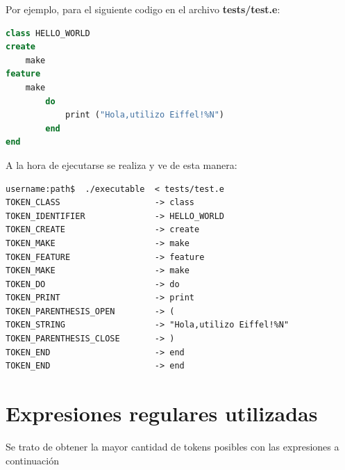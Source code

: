 \documentclass[a4paper,12pt]{article}
\begin{document}
\vspace{4mm}
\noindent
Por ejemplo, para el siguiente codigo en el archivo \textbf{tests/test.e}:

\begin{lstlisting}[language=Eiffel, style=myeiffel]
class HELLO_WORLD
create
    make
feature
    make
        do
            print ("Hola,utilizo Eiffel!%N")
        end
end
\end{lstlisting}

\vspace{4mm}
\noindent
A la hora de ejecutarse se realiza y ve de esta manera:

\begin{lstlisting}[style=DOS]
username:path$  ./executable  < tests/test.e 
TOKEN_CLASS                   -> class
TOKEN_IDENTIFIER              -> HELLO_WORLD
TOKEN_CREATE                  -> create
TOKEN_MAKE                    -> make
TOKEN_FEATURE                 -> feature
TOKEN_MAKE                    -> make
TOKEN_DO                      -> do
TOKEN_PRINT                   -> print
TOKEN_PARENTHESIS_OPEN        -> (
TOKEN_STRING                  -> "Hola,utilizo Eiffel!%N"
TOKEN_PARENTHESIS_CLOSE       -> )
TOKEN_END                     -> end
TOKEN_END                     -> end
\end{lstlisting}

\vspace{6mm}
\section{Expresiones regulares utilizadas}
\vspace{4mm}

Se trato de obtener la mayor cantidad de tokens posibles con las expresiones a continuación
\end{document}
